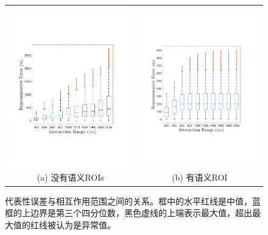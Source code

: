 \tabcolsep=3pt
\begin{figure}[!t]
\centering
\begin{tabular}{cc}
\includegraphics[width=70mm]{pics/relation_without2.pdf}&
\includegraphics[width=68mm]{pics/relation_with2.pdf}\\
(a) 没有语义ROIs & (b) 有语义ROI \\
\end{tabular}
\caption{代表性误差与相互作用范围之间的关系。框中的水平红线是中值，蓝框的上边界是第三个四分位数，黑色虚线的上端表示最大值，超出最大值的红线被认为是异常值。}
\label{fig:relation}
\end{figure}



